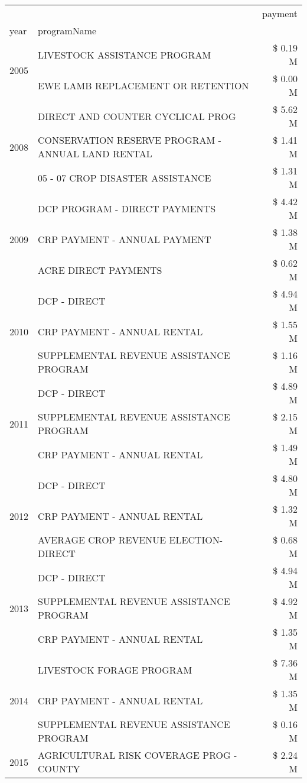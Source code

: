 \begin{tabular}{llr}
\toprule
 &  & payment \\
year & programName &  \\
\midrule
\multirow[t]{2}{*}{2005} & LIVESTOCK ASSISTANCE PROGRAM & \$ 0.19 M \\
 & EWE LAMB REPLACEMENT OR RETENTION & \$ 0.00 M \\
\cline{1-3}
\multirow[t]{3}{*}{2008} & DIRECT AND COUNTER CYCLICAL PROG & \$ 5.62 M \\
 & CONSERVATION RESERVE PROGRAM - ANNUAL LAND RENTAL & \$ 1.41 M \\
 & 05 - 07 CROP DISASTER ASSISTANCE & \$ 1.31 M \\
\cline{1-3}
\multirow[t]{3}{*}{2009} & DCP PROGRAM - DIRECT PAYMENTS & \$ 4.42 M \\
 & CRP PAYMENT - ANNUAL PAYMENT & \$ 1.38 M \\
 & ACRE DIRECT PAYMENTS & \$ 0.62 M \\
\cline{1-3}
\multirow[t]{3}{*}{2010} & DCP - DIRECT & \$ 4.94 M \\
 & CRP PAYMENT - ANNUAL RENTAL & \$ 1.55 M \\
 & SUPPLEMENTAL REVENUE ASSISTANCE PROGRAM & \$ 1.16 M \\
\cline{1-3}
\multirow[t]{3}{*}{2011} & DCP - DIRECT & \$ 4.89 M \\
 & SUPPLEMENTAL REVENUE ASSISTANCE PROGRAM & \$ 2.15 M \\
 & CRP PAYMENT - ANNUAL RENTAL & \$ 1.49 M \\
\cline{1-3}
\multirow[t]{3}{*}{2012} & DCP - DIRECT & \$ 4.80 M \\
 & CRP PAYMENT - ANNUAL RENTAL & \$ 1.32 M \\
 & AVERAGE CROP REVENUE ELECTION-DIRECT & \$ 0.68 M \\
\cline{1-3}
\multirow[t]{3}{*}{2013} & DCP - DIRECT & \$ 4.94 M \\
 & SUPPLEMENTAL REVENUE ASSISTANCE PROGRAM & \$ 4.92 M \\
 & CRP PAYMENT - ANNUAL RENTAL & \$ 1.35 M \\
\cline{1-3}
\multirow[t]{3}{*}{2014} & LIVESTOCK FORAGE PROGRAM & \$ 7.36 M \\
 & CRP PAYMENT - ANNUAL RENTAL & \$ 1.35 M \\
 & SUPPLEMENTAL REVENUE ASSISTANCE PROGRAM & \$ 0.16 M \\
\cline{1-3}
\multirow[t]{3}{*}{2015} & AGRICULTURAL RISK COVERAGE PROG - COUNTY & \$ 2.24 M \\

\end{tabular}
